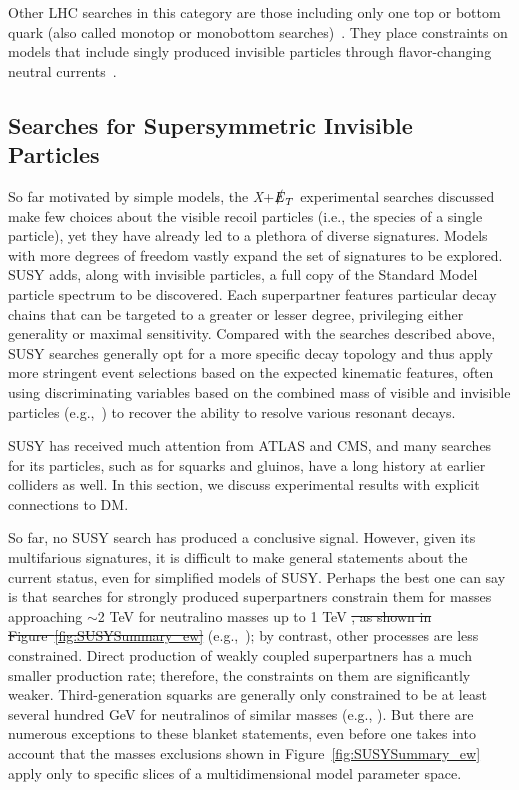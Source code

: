 \documentclass{ar-1col}
\newcommand{\IP}{invisible particle}
\newcommand{\MET}{\ensuremath{\slashed{E}_T}\xspace}
\providecommand{\DIFadd}[1]{{\protect\color{blue}\uwave{#1}}} %
\providecommand{\DIFdel}[1]{{\protect\color{red}\sout{#1}}}                      %
\providecommand{\DIFaddbegin}{} %
\providecommand{\DIFaddend}{} %
\providecommand{\DIFdelbegin}{} %
\providecommand{\DIFdelend}{} %
\begin{document}
{Other LHC searches in this category are those including only
one top or bottom quark (also called monotop or monobottom
searches)~\cite{Sirunyan:2018gka, Aad:2014wza}. They place
constraints on models that include singly produced {\IP}s through
flavor-changing neutral currents~\cite{Boucheneb:2014wza}.

\subsection{Searches for Supersymmetric Invisible Particles}\label{sec:results_SUSYSearches}

So far motivated by simple models, the \textit{X}+\MET experimental
searches discussed make few choices about the visible recoil
particles (i.e., the species of a single particle), yet they have
already led to a plethora of diverse signatures. Models with more degrees of freedom vastly expand the set of
signatures to be explored. SUSY adds, along with
{\IP}s, a full copy of the Standard Model particle
spectrum to be discovered. Each superpartner features particular decay chains that
can be targeted to a greater or lesser degree, privileging either
generality or maximal sensitivity. Compared with the 
searches described above, SUSY searches generally opt for a more specific
decay topology and thus apply more stringent event selections
based on the expected kinematic features, often using
discriminating variables based on the combined mass of visible and
invisible particles (e.g.,~) to recover
the ability to resolve various resonant decays.

SUSY has received much attention from ATLAS and CMS, and many
searches for its particles, such as for squarks and gluinos, have
a long history at earlier colliders as well. In this section, we
discuss experimental results with explicit connections to DM.

So far, no SUSY search has produced a conclusive signal. However,
given its multifarious signatures, it is difficult to make general
statements about the current status, even for simplified models of
SUSY. Perhaps the best one can say is that searches for
strongly produced superpartners constrain them for masses
approaching $\sim$2 TeV for neutralino masses up to 1 TeV
\DIFdelbegin \DIFdel{, as shown in Figure~\ref{fig:SUSYSummary_ew}
}\DIFdelend (e.g.,~); by contrast, other processes are
less constrained. Direct production of weakly coupled
superpartners has a much smaller production rate; therefore, the
constraints on them are significantly weaker\DIFaddbegin \DIFadd{, as shown in Figure~\ref{fig:SUSYSummary_ew}}\DIFaddend .
Third-generation squarks are generally only constrained to be at least several
hundred GeV for neutralinos of similar masses (e.g., ). But there are
numerous exceptions to these blanket statements, even before one
takes into account that the masses exclusions shown in Figure~\ref{fig:SUSYSummary_ew} 
apply only to specific slices of a multidimensional model parameter
space.

}
\end{document}
